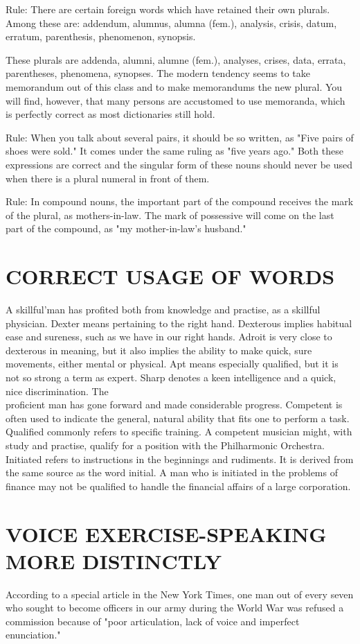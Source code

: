 \documentclass[10pt]{article}
\begin{document}
Rule: There are certain foreign words which have retained their own plurals. Among these are: addendum, alumnus, alumna (fem.), analysis, crisis, datum, erratum, parenthesis, phenomenon, synopsis.

These plurals are addenda, alumni, alumne (fem.), analyses, crises, data, errata, parentheses, phenomena, synopses. The modern tendency seems to take memorandum out of this class and to make memorandums the new plural. You will find, however, that many persons are accustomed to use memoranda, which is perfectly correct as most dictionaries still hold.

Rule: When you talk about several pairs, it should be so written, as "Five pairs of shoes were sold." It comes under the same ruling as "five years ago." Both these expressions are correct and the singular form of these nouns should never be used when there is a plural numeral in front of them.

Rule: In compound nouns, the important part of the compound receives the mark of the plural, as mothers-in-law. The mark of possessive will come on the last part of the compound, as "my mother-in-law's husband."

\section*{CORRECT USAGE OF WORDS}
A skillful'man has profited both from knowledge and practise, as a skillful physician. Dexter means pertaining to the right hand. Dexterous implies habitual ease and sureness, such as we have in our right hands. Adroit is very close to dexterous in meaning, but it also implies the ability to make quick, sure movements, either mental or physical. Apt means especially qualified, but it is not so strong a term as expert. Sharp denotes a keen intelligence and a quick, nice discrimination. The\\
proficient man has gone forward and made considerable progress. Competent is often used to indicate the general, natural ability that fits one to perform a task. Qualified commonly refers to specific training. A competent musician might, with study and practise, qualify for a position with the Philharmonic Orchestra. Initiated refers to instructions in the beginnings and rudiments. It is derived from the same source as the word initial. A man who is initiated in the problems of finance may not be qualified to handle the financial affairs of a large corporation.

\section*{VOICE EXERCISE-SPEAKING MORE DISTINCTLY}
According to a special article in the New York Times, one man out of every seven who sought to become officers in our army during the World War was refused a commission because of "poor articulation, lack of voice and imperfect enunciation."
\end{document}

